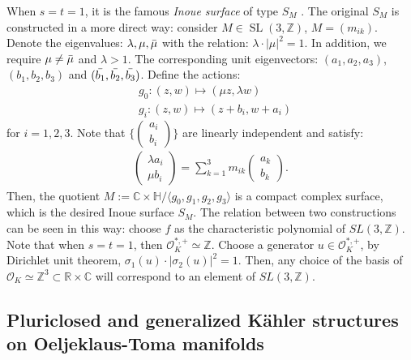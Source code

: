 \documentclass[12pt]{amsart}
\numberwithin{equation}{section}
\numberwithin{prop}{section}
\theoremstyle{definition}
\begin{document}
    When $s=t=1$, it is the famous \textit{Inoue surface} of type $S_M$ \cite{inoue1974surfaces}. The original $S_M$ is constructed in a more direct way:
    consider $M\in \operatorname{SL}(3,\mathbb{Z})$, $M=(m_{ik})$. Denote the eigenvalues: $\lambda, \mu, \Bar{\mu}$ with the relation: $\lambda\cdot |\mu|^2=1$. In addition, we require $\mu\neq \Bar{\mu}$ and $\lambda >1$. The corresponding unit eigenvectors: $(a_1,a_2,a_3)$, $(b_1, b_2, b_3)$ and $(\Bar{b_1}, \Bar{b_2}, \Bar{b_3})$. Define the actions:
    \begin{align*}
        &g_0:(z,w)\mapsto (\mu z, \lambda w)\\
        &g_i:(z,w)\mapsto (z+b_i, w+a_i)
    \end{align*}
    for $i=1,2,3$. Note that $\{\left(\begin{aligned}
        a_i\\
        b_i
    \end{aligned}\right)\}$ are linearly independent and satisfy:
    \begin{align*}
        \left(\begin{aligned}
            \lambda a_i\\
            \mu b_i
    \end{aligned}
    \right) = \sum_{k=1}^3 m_{ik}\left(\begin{aligned}
        a_k\\
        b_k
    \end{aligned}
    \right).
    \end{align*}
    Then, the quotient $M:=\mathbb{C}\times\mathbb{H}/\langle g_0, g_1, g_2, g_3\rangle$ is a compact complex surface, which is the desired Inoue surface $S_M$. The relation between two constructions can be seen in this way:
    choose $f$ as the characteristic polynomial of $SL(3,\mathbb{Z})$. Note that when $s=t=1$, then $\mathcal{O}_K^{*,+}\simeq\mathbb{Z}$. Choose a generator $u\in\mathcal{O}_K^{*,+}$, by Dirichlet unit theorem, $\sigma_1(u)\cdot|\sigma_2(u)|^2=1$. Then, any choice of the basis of $\mathcal{O}_K\simeq\mathbb{Z}^3\subset\mathbb{R}\times\mathbb{C}$ will correspond to an element of $SL(3,\mathbb{Z})$.


    \subsection{Pluriclosed and generalized K\"ahler structures on Oeljeklaus-Toma manifolds} \label{s:OT_PC_metrics}
    
\end{document}
